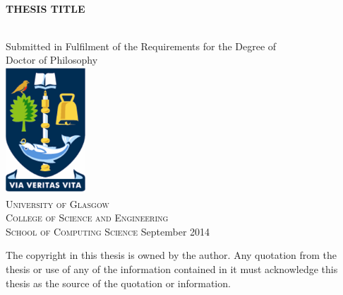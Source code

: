 \documentclass[a4paper,12pt]{report}
\newcommand{\auth}{FName LName}
\newcommand{\thesistitle}{Thesis Title}
\newcommand{\degree}{Doctor of Philosophy}
\newcommand{\supdate}{September 2014}
\begin{document}
\begin{spacing}{1.5}

\pagestyle{empty}
\begin{center}
\begin{spacing}{2}
{\large{\ \\  \vspace{1.5cm}\textbf{\MakeUppercase{\thesistitle}}}}\\
\end{spacing}
\vfill
{\Large\upshape{\auth}}\\\vspace{2.0cm}
{\large Submitted in Fulfilment of the Requirements for the Degree of \\ \degree}\\
\vspace{1cm}
\includegraphics[width=3cm]{Front/Figures/Logo.png}\\
\vspace{0.5cm}
{\large\textsc{University of Glasgow}\\
\textsc{College of Science and Engineering}\\
\textsc{School of Computing Science}}\vfill
{\large{\supdate}}
\end{center}
{\small The copyright in this thesis is owned by the author. Any quotation from the thesis or use of any of the information contained in it must acknowledge this thesis as the source of the quotation or information.}
\clearpage
\pagestyle{plain}

\newpage

\newpage

\newpage

\newpage
\tableofcontents
\listoftables
\listoffigures

\clearpage
\pagestyle{fancy}
\fancyhead{}
\lhead{\slshape \leftmark}  
\cfoot{\thepage}
\renewcommand{\headrulewidth}{0.4pt}
\renewcommand{\footrulewidth}{0.0pt}
\renewcommand{\chaptermark}[1]{\markboth{\chaptername\ \thechapter. \ #1}{}}



\end{spacing}
\end{document}
